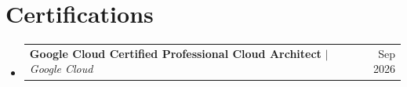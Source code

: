 \documentclass[letterpaper,11pt]{article}
\makeatletter
\newcommand{\resumeProjectHeading}[2]{
    \item
    \begin{tabular*}{0.97\textwidth}{l@{\extracolsep{\fill}}r}
      \small#1 & #2 \\
    \end{tabular*}\vspace{-7pt}
}
\newcommand{\resumeSubHeadingListStart}{\begin{itemize}[leftmargin=0.15in, label={}]}
\newcommand{\resumeSubHeadingListEnd}{\end{itemize}}
\makeatother
\begin{document}
\section{Certifications}
    \resumeSubHeadingListStart
      \resumeProjectHeading
          {\textbf{Google Cloud Certified Professional Cloud Architect} $|$ \emph{Google Cloud}}{Sep 2026}
    \resumeSubHeadingListEnd


\end{document}
